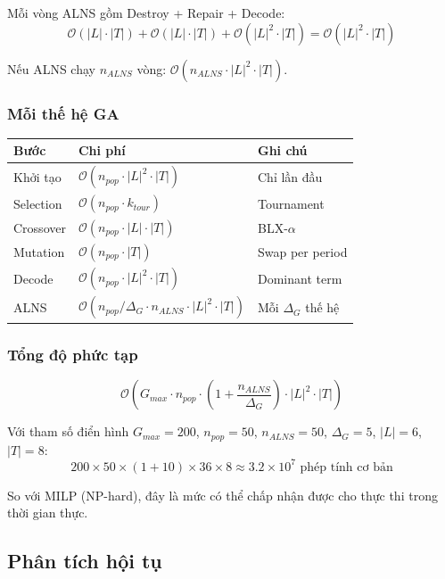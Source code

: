 \documentclass[12pt]{article}
\begin{document}
Mỗi vòng ALNS gồm Destroy + Repair + Decode:
\[
\mathcal{O}(|L| \cdot |T|) + \mathcal{O}(|L| \cdot |T|) + \mathcal{O}(|L|^2 \cdot |T|) = \mathcal{O}(|L|^2 \cdot |T|)
\]

Nếu ALNS chạy $n_{ALNS}$ vòng: $\mathcal{O}(n_{ALNS} \cdot |L|^2 \cdot |T|)$.

\subsubsection*{Mỗi thế hệ GA}

\begin{center}
\begin{tabular}{lll}
\toprule
\textbf{Bước} & \textbf{Chi phí} & \textbf{Ghi chú} \\
\midrule
Khởi tạo & $\mathcal{O}(n_{pop} \cdot |L|^2 \cdot |T|)$ & Chỉ lần đầu \\
Selection & $\mathcal{O}(n_{pop} \cdot k_{tour})$ & Tournament \\
Crossover & $\mathcal{O}(n_{pop} \cdot |L| \cdot |T|)$ & BLX-$\alpha$ \\
Mutation & $\mathcal{O}(n_{pop} \cdot |T|)$ & Swap per period \\
Decode & $\mathcal{O}(n_{pop} \cdot |L|^2 \cdot |T|)$ & Dominant term \\
ALNS & $\mathcal{O}(n_{pop} / \Delta_G \cdot n_{ALNS} \cdot |L|^2 \cdot |T|)$ & Mỗi $\Delta_G$ thế hệ \\
\bottomrule
\end{tabular}
\end{center}

\subsubsection*{Tổng độ phức tạp}

\[
\mathcal{O}\!\left(G_{max} \cdot n_{pop} \cdot \left(1 + \frac{n_{ALNS}}{\Delta_G}\right) \cdot |L|^2 \cdot |T|\right)
\]

Với tham số điển hình $G_{max}=200$, $n_{pop}=50$, $n_{ALNS}=50$, $\Delta_G=5$, $|L|=6$, $|T|=8$:
\[
200 \times 50 \times (1 + 10) \times 36 \times 8 \approx 3.2 \times 10^7 \text{ phép tính cơ bản}
\]

So với MILP (NP-hard), đây là mức có thể chấp nhận được cho thực thi trong thời gian thực.

\subsection{Phân tích hội tụ}
\end{document}
